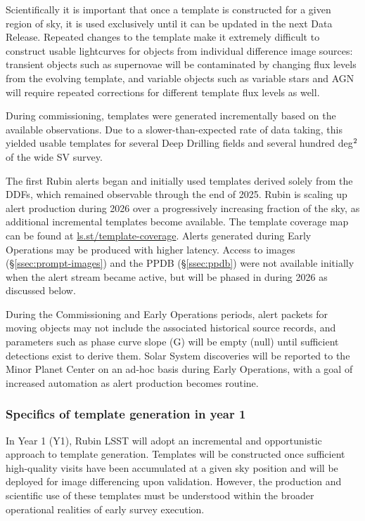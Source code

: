 Scientifically it is important that once a template is constructed for a given region of sky, it is used exclusively until it can be updated in the next Data Release.
Repeated changes to the template make it extremely difficult to construct usable lightcurves for objects from individual difference image sources: transient objects such as supernovae will be contaminated by changing flux levels from the evolving template, and variable objects such as variable stars and AGN will require repeated corrections for different template flux levels as well.

During commissioning, templates were generated incrementally based on the available observations.
Due to a slower-than-expected rate of data taking, this yielded usable templates for several Deep Drilling fields and several hundred deg$^{\rm 2}$ of the wide SV survey.

The first Rubin alerts began \rubinfirstalerts{} and initially used templates derived solely from the DDFs, which remained observable through the end of 2025.
Rubin is scaling up alert production during 2026 over a progressively increasing fraction of the sky, as additional incremental templates become available.
The template coverage map can be found at \url{ls.st/template-coverage}.
Alerts generated during Early Operations may be produced with higher latency.
Access to images (\S\ref{ssec:prompt-images}) and the PPDB (\S\ref{ssec:ppdb}) were not available initially when the alert stream became active, but will be phased in during 2026 as discussed below.

During the Commissioning and Early Operations periods, alert packets for moving objects may not include the associated historical source records, and parameters such as phase curve slope (G) will be empty (null) until sufficient detections exist to derive them.
Solar System discoveries will be reported to the Minor Planet Center on an ad-hoc basis during Early Operations, with a goal of increased automation as alert production becomes routine.

\subsubsection{Specifics of template generation in year 1}

In Year 1 (Y1), Rubin LSST will adopt an incremental and opportunistic approach to template generation.
Templates will be constructed once sufficient high-quality visits have been accumulated at a given sky position and will be deployed for image differencing upon validation.
However, the production and scientific use of these templates must be understood within the broader operational realities of early survey execution.

